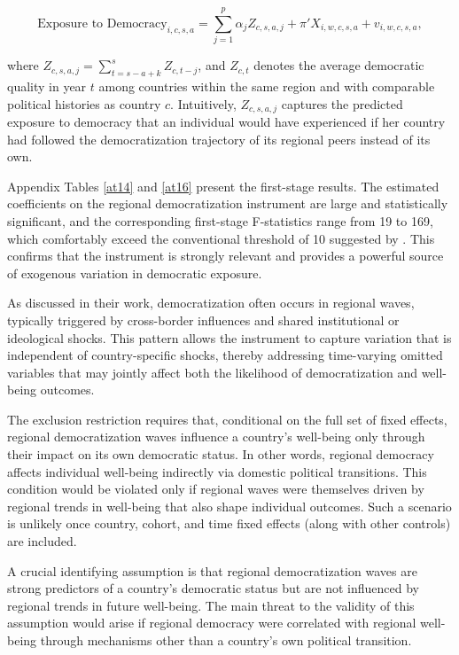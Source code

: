 \documentclass[11pt]{article}
\newcommand{\bbb}[1]{\cTwo{#1}} %
\begin{document}
\begin{equation}
	\label{5}
	\text{Exposure to Democracy}_{i,c,s,a}
	= \sum_{j=1}^{p} \alpha_j Z_{c,s,a,j} + \pi' X_{i,w,c,s,a} + v_{i,w,c,s,a},
\end{equation}

where \(Z_{c,s,a,j} = \sum_{t=s-a+k}^{s} Z_{c,t-j}\), and \(Z_{c,t}\) denotes the average democratic quality in year \(t\) among countries within the same region and with comparable political histories as country \(c\). Intuitively, \(Z_{c,s,a,j}\) captures the predicted exposure to democracy that an individual would have experienced if her country had followed the democratization trajectory of its regional peers instead of its own.

Appendix Tables \ref{at14} and \ref{at16} present the first-stage results. The estimated coefficients on the regional democratization instrument are large and statistically significant, and the corresponding first-stage F-statistics range from 19 to 169, which comfortably exceed the conventional threshold of 10 suggested by \bbb{Staiger1997}. This confirms that the instrument is strongly relevant and provides a powerful source of exogenous variation in democratic exposure.

As discussed in their work, democratization often occurs in regional waves, typically triggered by cross-border influences and shared institutional or ideological shocks. This pattern allows the instrument to capture variation that is independent of country-specific shocks, thereby addressing time-varying omitted variables that may jointly affect both the likelihood of democratization and well-being outcomes.

The exclusion restriction requires that, conditional on the full set of fixed effects, regional democratization waves influence a country’s well-being only through their impact on its own democratic status. In other words, regional democracy affects individual well-being indirectly via domestic political transitions. This condition would be violated only if regional waves were themselves driven by regional trends in well-being that also shape individual outcomes. Such a scenario is unlikely once country, cohort, and time fixed effects (along with other controls) are included.

A crucial identifying assumption is that regional democratization waves are strong predictors of a country’s democratic status but are not influenced by regional trends in future well-being. The main threat to the validity of this assumption would arise if regional democracy were correlated with regional well-being through mechanisms other than a country’s own political transition.
\end{document}
